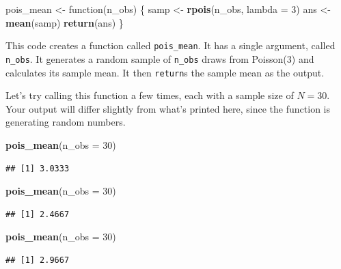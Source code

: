 \documentclass[12pt,oneside,openany]{book}
\newenvironment{Shaded}{\begin{snugshade}}{\end{snugshade}}
\newcommand{\KeywordTok}[1]{\textcolor[rgb]{0.13,0.29,0.53}{\textbf{{#1}}}}
\newcommand{\DataTypeTok}[1]{\textcolor[rgb]{0.13,0.29,0.53}{{#1}}}
\newcommand{\DecValTok}[1]{\textcolor[rgb]{0.00,0.00,0.81}{{#1}}}
\newcommand{\StringTok}[1]{\textcolor[rgb]{0.31,0.60,0.02}{{#1}}}
\newcommand{\NormalTok}[1]{{#1}}
\begin{document}
\begin{Shaded}
\begin{Highlighting}[]
\NormalTok{pois_mean <-}\StringTok{ }\NormalTok{function(n_obs) \{}
  \NormalTok{samp <-}\StringTok{ }\KeywordTok{rpois}\NormalTok{(n_obs, }\DataTypeTok{lambda =} \DecValTok{3}\NormalTok{)}
  \NormalTok{ans <-}\StringTok{ }\KeywordTok{mean}\NormalTok{(samp)}
  \KeywordTok{return}\NormalTok{(ans)}
\NormalTok{\}}
\end{Highlighting}
\end{Shaded}

This code creates a function called \texttt{pois\_mean}. It has a single
argument, called \texttt{n\_obs}. It generates a random sample of
\texttt{n\_obs} draws from Poisson(3) and calculates its sample mean. It
then \texttt{return}s the sample mean as the output.

Let's try calling this function a few times, each with a sample size of
\(N = 30\). Your output will differ slightly from what's printed here,
since the function is generating random numbers.

\begin{Shaded}
\begin{Highlighting}[]
\KeywordTok{pois_mean}\NormalTok{(}\DataTypeTok{n_obs =} \DecValTok{30}\NormalTok{)}
\end{Highlighting}
\end{Shaded}

\begin{verbatim}
## [1] 3.0333
\end{verbatim}

\begin{Shaded}
\begin{Highlighting}[]
\KeywordTok{pois_mean}\NormalTok{(}\DataTypeTok{n_obs =} \DecValTok{30}\NormalTok{)}
\end{Highlighting}
\end{Shaded}

\begin{verbatim}
## [1] 2.4667
\end{verbatim}

\begin{Shaded}
\begin{Highlighting}[]
\KeywordTok{pois_mean}\NormalTok{(}\DataTypeTok{n_obs =} \DecValTok{30}\NormalTok{)}
\end{Highlighting}
\end{Shaded}

\begin{verbatim}
## [1] 2.9667
\end{verbatim}
\end{document}
